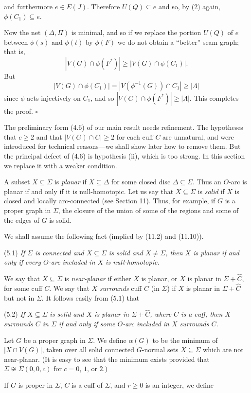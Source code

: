 \noindent and furthermore $e \in E(J)$. Therefore $U(Q) \subseteq e$ and so, by (2) again, $\phi(C_1) \subseteq e$.

Now the net $(\Delta, \Pi)$ is minimal, and so if we replace the portion $U(Q)$ of $e$ between $\phi(s)$ and $\phi(t)$ by $\phi(F)$ we do not obtain a ``better'' seam graph; that is,
\begin{equation*}
|V(G) \cap \phi(F^*)| \ge |V(G) \cap \phi(C_1)|.
\end{equation*}
But
\begin{equation*}
|V(G) \cap \phi(C_1)| = |V(\phi^{-1}(G)) \cap C_1| \ge |\Lambda|
\end{equation*}
since $\phi$ acts injectively on $C_1$, and so $|V(G) \cap \phi(F^*)| \ge |\Lambda|$. This completes the proof. $\square$


The preliminary form (4.6) of our main result needs refinement. The hypotheses that $c \ge 2$ and that $|V(G) \cap C| \ge 2$ for each cuff $C$ are unnatural, and were introduced for technical reasons---we shall show later how to remove them. But the principal defect of (4.6) is hypothesis (ii), which is too strong. In this section we replace it with a weaker condition.

A subset $X \subseteq \Sigma$ is \textit{planar} if $X \subseteq \Delta$ for some closed disc $\Delta \subseteq \Sigma$. Thus an $O$-arc is planar if and only if it is null-homotopic. Let us say that $X \subseteq \Sigma$ is \textit{solid} if $X$ is closed and locally arc-connected (see Section 11). Thus, for example, if $G$ is a proper graph in $\Sigma$, the closure of the union of some of the regions and some of the edges of $G$ is solid.

We shall assume the following fact (implied by (11.2) and (11.10)).

\stmt
(5.1) \textit{If $\Sigma$ is connected and $X \subseteq \Sigma$ is solid and $X \ne \Sigma$, then $X$ is planar if and only if every $O$-arc included in $X$ is null-homotopic.}

We say that $X \subseteq \Sigma$ is \textit{near-planar} if either $X$ is planar, or $X$ is planar in $\Sigma + \hat{C}$, for some cuff $C$. We say that $X$ \textit{surrounds} cuff $C$ (in $\Sigma$) if $X$ is planar in $\Sigma + \hat{C}$ but not in $\Sigma$. It follows easily from (5.1) that

\stmt
(5.2) \textit{If $X \subseteq \Sigma$ is solid and $X$ is planar in $\Sigma + \hat{C}$, where $C$ is a cuff, then $X$ surrounds $C$ in $\Sigma$ if and only if some $O$-arc included in $X$ surrounds $C$.}

Let $G$ be a proper graph in $\Sigma$. We define $\alpha(G)$ to be the minimum of $|X \cap V(G)|$, taken over all solid connected $G$-normal sets $X \subseteq \Sigma$ which are not near-planar. (It is easy to see that the minimum exists provided that $\Sigma \not\cong \Sigma(0, 0, c)$ for $c = 0$, $1$, or $2$.)

If $G$ is proper in $\Sigma$, $C$ is a cuff of $\Sigma$, and $r \ge 0$ is an integer, we define

